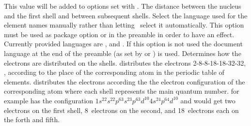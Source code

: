 \documentclass[load-preamble+]{cnltx-doc}
\begin{document}
\begin{options}
  \Default
    This value will be added to options set with .
  \Default{1em}
    The distance between the nucleus and the first shell and between subsequent
    shells.
  \Default
    Select the language used for the element names manually
    rather than letting \BOHR\ select it automatically.  This option must be
    used as package option or in the preamble in order to have an effect.
    Currently provided languages are ,  and
    .  If this option is not used the document language at the
    end of the preamble (as set by  or ) is
    used.
    Determines how the electrons are distributed on the
    shells.   distributes the electrons 2-8-8-18-18-32-32, \ie,
    according to the place of the corresponding atom in the periodic table of
    elements.   distributes the electrons according the the
    electron configuration of the corresponding atom where each shell
    represents the main quantum number.   for example has the
    configuration $1s^22s^22p^63s^23p^63d^{10}4s^24p^64d^{10}$ and would get
    two electrons on the first shell, 8~electrons on the second, and
    18~electrons each on the forth and fifth.
\end{options}

\begin{example}
   
\end{example}

\begin{example}
   
\end{example}

\begin{example}
   
\end{example}
\end{document}
